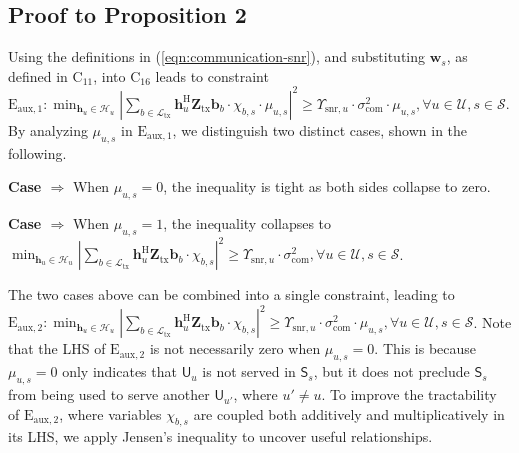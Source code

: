 \documentclass[10pt,journal,compsoc]{IEEEtran}
\newcommand*\circled[1]{\tikz[baseline=(char.base)]{
            \node[shape=circle,draw,inner sep=2pt] (char) {#1};}}
\theoremstyle{myremark}
\theoremstyle{myexample}
\begin{document}
\begin{appendices}
\setcounter{equation}{0}
\setcounter{table}{0}
\renewcommand{\theequation}{H.\arabic{equation}}
\section{Proof to Proposition 2} \label{app:proof-proposition-2}

Using the definitions in (\ref{eqn:communication-snr}), and substituting $ \mathbf{w}_s $, as defined in $ \mathrm{C}_{11} $, into  $ \mathrm{C}_{16} $ leads to constraint $ \mathrm{E}_{\mathrm{aux},1}: \min_{ \mathbf{h}_u \in \mathcal{H}_u } \left| \sum_{b \in \mathcal{L}_\mathrm{tx}} \mathbf{h}_u^\mathrm{H} \mathbf{Z}_\mathrm{tx} \mathbf{b}_b \cdot \chi_{b,s} \cdot \mu_{u,s} \right|^2 \geq \Upsilon_{\mathrm{snr},u} \cdot \sigma_\mathrm{com}^2 \cdot \mu_{u,s}, \forall u \in \mathcal{U}, s \in \mathcal{S} $. By analyzing $ \mu_{u,s} $ in $ \mathrm{E}_{\mathrm{aux},1} $, we distinguish two distinct cases, shown in the following.
	
	
\noindent \textbf{Case \circled{\footnotesize{1}} $\Rightarrow$ } When $ \mu_{u,s} = 0 $, the inequality is tight as both sides collapse to zero.

\noindent \textbf{Case \circled{\footnotesize{2}} $\Rightarrow$ } When $ \mu_{u,s} = 1 $, the inequality collapses to $ \min_{ \mathbf{h}_u \in \mathcal{H}_u } \left| \sum_{b \in \mathcal{L}_\mathrm{tx}} \mathbf{h}_u^\mathrm{H} \mathbf{Z}_\mathrm{tx} \mathbf{b}_b \cdot \chi_{b,s} \right|^2 \geq \Upsilon_{\mathrm{snr},u} \cdot \sigma_\mathrm{com}^2, \forall u \in \mathcal{U}, s \in \mathcal{S} $.

The two cases above can be combined into a single constraint, leading to  $ \mathrm{E}_{\mathrm{aux},2}: \min_{ \mathbf{h}_u \in \mathcal{H}_u } \left| \sum_{b \in \mathcal{L}_\mathrm{tx}} \mathbf{h}_u^\mathrm{H} \mathbf{Z}_\mathrm{tx} \mathbf{b}_b \cdot \chi_{b,s} \right|^2  \geq \Upsilon_{\mathrm{snr},u} \cdot \sigma_\mathrm{com}^2 \cdot \mu_{u,s}, \forall u \in \mathcal{U}, s \in \mathcal{S} $. Note that the \gls{LHS} of $ \mathrm{E}_{\mathrm{aux},2} $ is not necessarily zero when $ \mu_{u,s} = 0 $. This is because $ \mu_{u,s} = 0 $ only indicates that \( \mathsf{U}_{u} \) is not served in $ \mathsf{S}_s $, but it does not preclude $ \mathsf{S}_s $ from being used to serve another $ \mathsf{U}_{u'} $, where $ u' \neq u $. To improve the tractability of $ \mathrm{E}_{\mathrm{aux},2} $, where  variables $ \chi_{b,s} $ are coupled both additively and multiplicatively in its \gls{LHS}, we apply Jensen's inequality to uncover useful relationships. 



\end{appendices}
\end{document}
